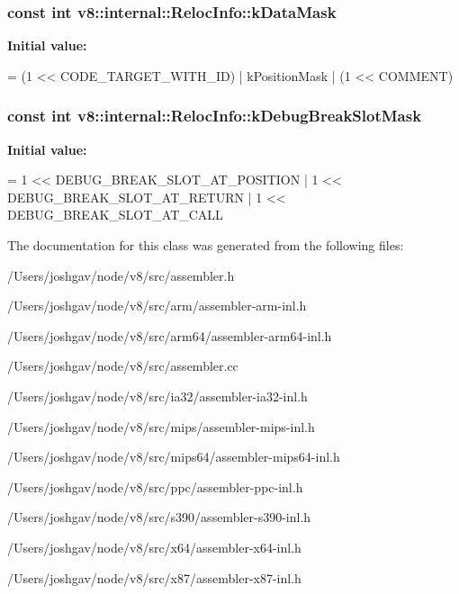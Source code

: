 \subsubsection[{\texorpdfstring{k\+Data\+Mask}{kDataMask}}]{\setlength{\rightskip}{0pt plus 5cm}const int v8\+::internal\+::\+Reloc\+Info\+::k\+Data\+Mask\hspace{0.3cm}{\ttfamily [static]}}\hypertarget{classv8_1_1internal_1_1_reloc_info_a81087f9aba7b7a2a529d3c166093fb61}{}\label{classv8_1_1internal_1_1_reloc_info_a81087f9aba7b7a2a529d3c166093fb61}
{\bfseries Initial value\+:}
\begin{DoxyCode}
=
      (1 << CODE\_TARGET\_WITH\_ID) | kPositionMask | (1 << COMMENT)
\end{DoxyCode}
\subsubsection[{\texorpdfstring{k\+Debug\+Break\+Slot\+Mask}{kDebugBreakSlotMask}}]{\setlength{\rightskip}{0pt plus 5cm}const int v8\+::internal\+::\+Reloc\+Info\+::k\+Debug\+Break\+Slot\+Mask\hspace{0.3cm}{\ttfamily [static]}}\hypertarget{classv8_1_1internal_1_1_reloc_info_aeca0d03aa523f47ceef42805b80c9827}{}\label{classv8_1_1internal_1_1_reloc_info_aeca0d03aa523f47ceef42805b80c9827}
{\bfseries Initial value\+:}
\begin{DoxyCode}
= 1 << DEBUG\_BREAK\_SLOT\_AT\_POSITION |
                                         1 << DEBUG\_BREAK\_SLOT\_AT\_RETURN |
                                         1 << DEBUG\_BREAK\_SLOT\_AT\_CALL
\end{DoxyCode}


The documentation for this class was generated from the following files\+:\begin{DoxyCompactItemize}
\item 
/\+Users/joshgav/node/v8/src/assembler.\+h\item 
/\+Users/joshgav/node/v8/src/arm/assembler-\/arm-\/inl.\+h\item 
/\+Users/joshgav/node/v8/src/arm64/assembler-\/arm64-\/inl.\+h\item 
/\+Users/joshgav/node/v8/src/assembler.\+cc\item 
/\+Users/joshgav/node/v8/src/ia32/assembler-\/ia32-\/inl.\+h\item 
/\+Users/joshgav/node/v8/src/mips/assembler-\/mips-\/inl.\+h\item 
/\+Users/joshgav/node/v8/src/mips64/assembler-\/mips64-\/inl.\+h\item 
/\+Users/joshgav/node/v8/src/ppc/assembler-\/ppc-\/inl.\+h\item 
/\+Users/joshgav/node/v8/src/s390/assembler-\/s390-\/inl.\+h\item 
/\+Users/joshgav/node/v8/src/x64/assembler-\/x64-\/inl.\+h\item 
/\+Users/joshgav/node/v8/src/x87/assembler-\/x87-\/inl.\+h\end{DoxyCompactItemize}

